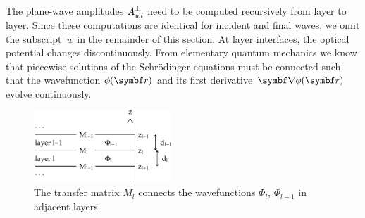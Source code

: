 The plane-wave amplitudes $A^\pm_{wl}$ need to be computed recursively
from layer to layer.
Since these computations are identical for incident and final waves,
we omit the subscript~$w$ in the remainder of this section.
At layer interfaces, the optical potential changes discontinuously.
From elementary quantum mechanics we know that
piecewise solutions of the Schrödinger equations must be connected
such that the wavefunction $\phi(\r)$ and its first derivative
$\Nabla\phi(\r)$ evolve continuously.

\begin{figure}[tb]
\begin{center}
\includegraphics[width=0.46\textwidth]{fig/drawing/multilayer_boundary.ps}
\end{center}
\caption{The transfer matrix $M_l$ connects the wavefunctions
%
%
%
$\Phi_l$, $\Phi_{l-1}$ in adjacent layers.}
\label{Fboundary}
\end{figure}

